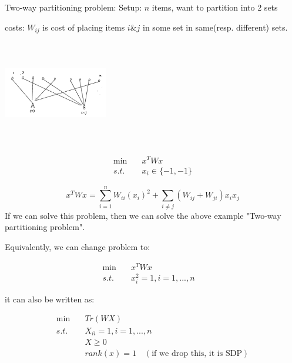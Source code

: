 \begin{example}{Two-way partitioning problem: }
	Setup: $n$ items, want to partition into 2 sets
	
	costs: $W_{ij}$ is cost of placing items $i\&j$ in some set in same(resp. different) sets.
	
	\begin{marginfigure}
	\centering
	\includegraphics[width=1.8in,height=1.8in]{figures/ch09/figure1120_1.png}
	\end{marginfigure}
\end{example}

\begin{align*}
\min \quad&x^TWx \\
s.t. \quad&x_i\in \{-1,-1 \} 
\end{align*}

\begin{equation*}
x^TWx = \sum^n_{i=1}W_{ii}(x_i)^2+\sum_{i\neq j}(W_{ij}+W_{ji})x_ix_j
\end{equation*}
If we can solve this problem, then we can solve the above example "Two-way partitioning problem".

Equivalently, we can change problem to:

\begin{align*}
\min \quad&x^TWx \\
s.t. \quad&x_i^2 = 1, i = 1,...,n\quad 
\end{align*}

it can also be written as:

\begin{align*}
\min \quad&Tr(WX) \\
s.t. \quad&X_{ii} = 1, i = 1,...,n\quad \\
&X\geq 0\\
&rank(x) = 1\quad(\text{if we drop this, it is SDP})
\end{align*}

